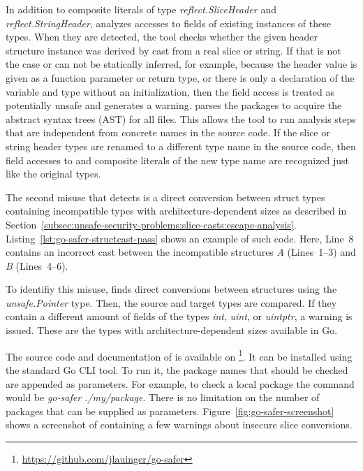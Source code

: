 

In addition to composite literals of type \textit{reflect.SliceHeader} and \textit{reflect.StringHeader}, \toolSafer{}
analyzes accesses to fields of existing instances of these types.
When they are detected, the tool checks whether the given header structure instance was derived by cast from a real
slice or string.
If that is not the case or can not be statically inferred, for example, because the header value is given as a function
parameter or return type, or there is only a declaration of the variable and type without an initialization, then the
field access is treated as potentially unsafe and \toolSafer{} generates a warning.
\toolSafer{} parses the packages to acquire the abstract syntax trees (\acrshort{AST}) for all files.
This allows the tool to run analysis steps that are independent from concrete names in the source code.
If the slice or string header types are renamed to a different type name in the source code, then field accesses to and
composite literals of the new type name are recognized just like the original types.

The second misuse that \toolSafer{} detects is a direct conversion between struct types containing incompatible types
with architecture-dependent sizes as described in
Section~\ref{subsec:unsafe-security-problems:slice-casts:escape-analysis}.
Listing~\ref{lst:go-safer-structcast-pass} shows an example of such code.
Here, Line~8 contains an incorrect cast between the incompatible structures \textit{A} (Lines~1--3) and \textit{B}
(Lines~4--6).



To identifiy this misuse, \toolSafer{} finds direct conversions between structures using the \textit{unsafe.Pointer}
type.
Then, the source and target types are compared.
If they contain a different amount of fields of the types \textit{int}, \textit{uint}, or \textit{uintptr}, a warning
is issued.
These are the types with architecture-dependent sizes available in Go.

The source code and documentation of \toolSafer{} is available on
\github{}\footnote{\url{https://github.com/jlauinger/go-safer}}.
It can be installed using the standard Go \acrshort{CLI} tool.
To run it, the package names that should be checked are appended as parameters.
For example, to check a local package the command would be \textit{go-safer ./my/package}.
There is no limitation on the number of packages that can be supplied as parameters.
Figure~\ref{fig:go-safer-screenshot} shows a screenshot of \toolSafer{} containing a few warnings about insecure slice
conversions.

